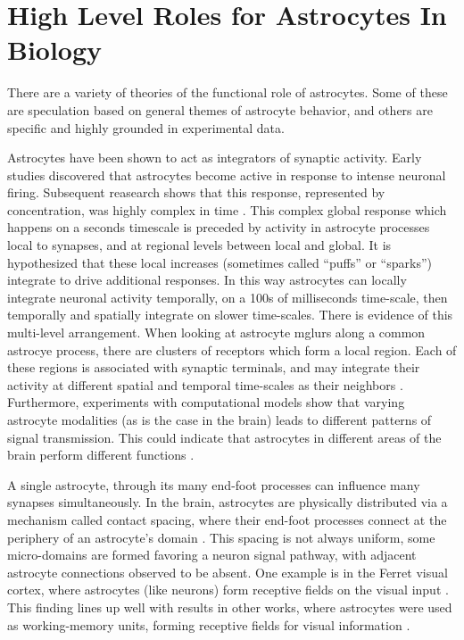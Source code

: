 
    \section{High Level Roles for Astrocytes In Biology}

    There are a variety of theories of the functional role of astrocytes.
    Some of these are speculation based on general themes of astrocyte behavior,
    and others are specific and highly grounded in experimental data.

    Astrocytes have been shown to act as integrators of synaptic activity. Early
    studies discovered that astrocytes become active in response to intense
    neuronal firing. Subsequent reasearch shows that this response, represented
    by \ca concentration, was highly complex in time
    \parencite{araque_2014}. This complex global response which happens on a
    seconds timescale is preceded by \ca activity in astrocyte processes local
    to synapses, and at regional levels between local and global. It is
    hypothesized that these local \ca increases (sometimes called ``puffs'' or
    ``sparks'') integrate to drive additional responses. In this way astrocytes
    can locally integrate neuronal activity temporally, on a 100s of
    milliseconds time-scale, then temporally and spatially integrate on slower
    time-scales. There is evidence of this multi-level arrangement. When looking
    at astrocyte \glspl{mglur} along a common astrocye process, there are
    clusters of receptors which form a local region. Each of these regions is
    associated with synaptic terminals, and may integrate their activity at
    different spatial and temporal time-scales as their neighbors
    \parencite{pitta_2012}. Furthermore, experiments with computational models
    show that varying astrocyte modalities (as is the case in the brain) leads
    to different patterns of signal transmission. This could indicate that
    astrocytes in different areas of the brain perform different functions
    \parencite{pitta_2012}.

    A single astrocyte, through its many end-foot processes can influence many
    synapses simultaneously. In the brain, astrocytes are physically distributed
    via a mechanism called contact spacing, where their end-foot processes
    connect at the periphery of an astrocyte's domain
    \parencite{pitta_2012}. This spacing is not always uniform, some
    micro-domains are formed favoring a neuron signal pathway, with adjacent
    astrocyte connections observed to be absent. One example is in the Ferret
    visual cortex, where astrocytes (like neurons) form receptive fields on the
    visual input \parencite{pitta_2012}. This finding lines up well with results
    in other works, where astrocytes were used as working-memory units, forming
    receptive fields for visual information \parencite{gordleeva_2021}.

